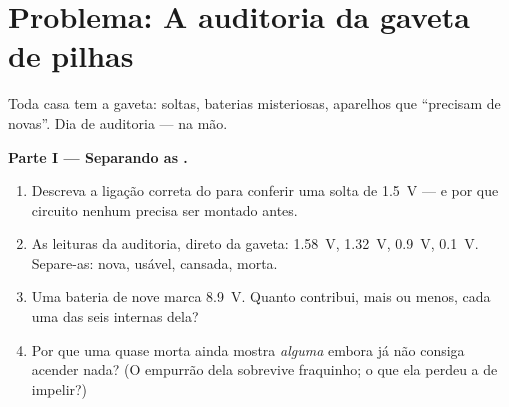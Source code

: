 \section{Problema: A auditoria da gaveta de pilhas}

\begin{problem}\label{pb:g8:voltage-voltmeter:1}
Toda casa tem a gaveta:  soltas, baterias misteriosas,
aparelhos que ``precisam de  novas''. Dia de auditoria ---
 na mão.

\medskip\noindent\textbf{Parte I --- Separando as .}
\begin{enumerate}
  \item Descreva a ligação correta do  para conferir uma
         solta de \qty{1.5}{V} --- e por que circuito nenhum
        precisa ser montado antes.
  \item As leituras da auditoria, direto da gaveta: \qty{1.58}{V},
        \qty{1.32}{V}, \qty{0.9}{V}, \qty{0.1}{V}. Separe-as: nova,
        usável, cansada, morta.
  \item Uma bateria de nove  marca \qty{8.9}{V}. Quanto
        contribui, mais ou menos, cada uma das seis  internas
        dela?
  \item Por que uma  quase morta ainda mostra \emph{alguma}
         embora já não consiga acender nada? (O empurrão dela
        sobrevive fraquinho; o que ela perdeu a  de impelir?)
\end{enumerate}


\end{problem}
